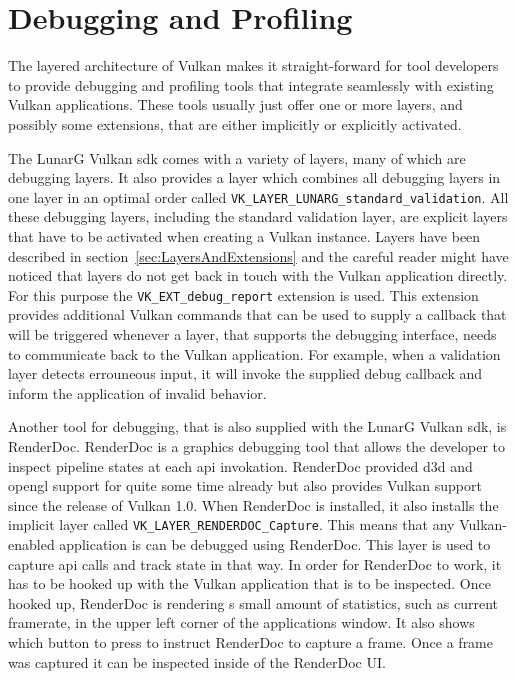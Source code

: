   \section{Debugging and Profiling}
  \label{sec:DebuggingAndProfiling}
    The layered architecture of Vulkan makes it straight-forward for tool developers to provide debugging and profiling tools that integrate seamlessly with existing Vulkan applications. These tools usually just offer one or more layers, and possibly some extensions, that are either implicitly or explicitly activated.

    The LunarG Vulkan \gls{sdk} comes with a variety of layers, many of which are debugging layers. It also provides a layer which combines all debugging layers in one layer in an optimal order called \lstinline{VK_LAYER_LUNARG_standard_validation}. All these debugging layers, including the standard validation layer, are explicit layers that have to be activated when creating a Vulkan instance. Layers have been described in section~\ref{sec:LayersAndExtensions} and the careful reader might have noticed that layers do not get back in touch with the Vulkan application directly. For this purpose the \lstinline{VK_EXT_debug_report} extension is used. This extension provides additional Vulkan commands that can be used to supply a callback that will be triggered whenever a layer, that supports the debugging interface, needs to communicate back to the Vulkan application. For example, when a validation layer detects errouneous input, it will invoke the supplied debug callback and inform the application of invalid behavior.

    Another tool for debugging, that is also supplied with the LunarG Vulkan \gls{sdk}, is RenderDoc\cite{renderdoc}. RenderDoc is a graphics debugging tool that allows the developer to inspect pipeline states at each \gls{api} invokation. RenderDoc provided \gls{d3d} and \gls{opengl} support for quite some time already but also provides Vulkan support since the release of Vulkan 1.0. When RenderDoc is installed, it also installs the implicit layer called \lstinline{VK_LAYER_RENDERDOC_Capture}. This means that any Vulkan-enabled application is can be debugged using RenderDoc. This layer is used to capture \gls{api} calls and track state in that way. In order for RenderDoc to work, it has to be hooked up with the Vulkan application that is to be inspected. Once hooked up, RenderDoc is rendering s small amount of statistics, such as current framerate, in the upper left corner of the applications window. It also shows which button to press to instruct RenderDoc to capture a frame. Once a frame was captured it can be inspected inside of the RenderDoc UI.

